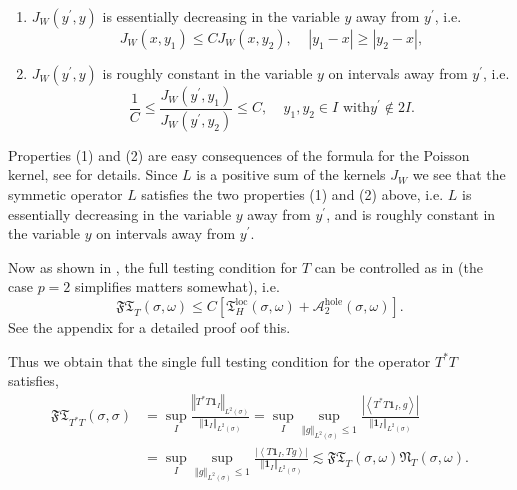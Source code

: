 \documentclass{amsart}%
\theoremstyle{plain}
\numberwithin{equation}{section}
\begin{document}
\begin{enumerate}
\item $J_{W}\left(  y^{\prime},y\right)  $ is essentially decreasing in the
variable $y$ away from $y^{\prime}$, i.e.%
\[
J_{W}\left(  x,y_{1}\right)  \leq CJ_{W}\left(  x,y_{2}\right)
,\ \ \ \ \ \left\vert y_{1}-x\right\vert \geq\left\vert y_{2}-x\right\vert ,
\]


\item $J_{W}\left(  y^{\prime},y\right)  $ is roughly constant in the variable
$y$ on intervals away from $y^{\prime}$, i.e.%
\[
\frac{1}{C}\leq\frac{J_{W}\left(  y^{\prime},y_{1}\right)  }{J_{W}\left(
y^{\prime},y_{2}\right)  }\leq C,\ \ \ \ \ y_{1},y_{2}\in I\text{ with
}y^{\prime}\notin2I.
\]

\end{enumerate}

Properties (1) and (2) are easy consequences of the formula for the Poisson
kernel, see \cite[(7.10) and (7.11)]{SaWi} for details. Since $L$ is a
positive sum of the kernels $J_{W}$ we see that the symmetic operator $L$
satisfies the two properties (1) and (2) above, i.e. $L$ is essentially
decreasing in the variable $y$ away from $y^{\prime}$, and is roughly constant
in the variable $y$ on intervals away from $y^{\prime}$.

Now as shown in \cite[Section 11, the appendix]{SaWi}, the full testing
condition for $T$ can be controlled as in \cite[Subsections 7.3 and 7.4]{SaWi}
(the case $p=2$ simplifies matters somewhat), i.e.%
\[
\mathfrak{FT}_{T}\left(  \sigma,\omega\right)  \leq C\left[  \mathfrak{T}%
_{H}^{\operatorname{loc}}\left(  \sigma,\omega\right)  +\mathcal{A}%
_{2}^{\operatorname*{hole}}\left(  \sigma,\omega\right)  \right]  .
\]
See the appendix for a detailed proof oof this.

Thus we obtain that the single full testing condition for the operator
$T^{\ast}T$ satisfies,%
\begin{align}
\mathfrak{FT}_{T^{\ast}T}\left(  \sigma,\sigma\right)    & =\sup_{I}%
\frac{\left\Vert T^{\ast}T\mathbf{1}_{I}\right\Vert _{L^{2}\left(
\sigma\right)  }}{\left\Vert \mathbf{1}_{I}\right\Vert _{L^{2}\left(
\sigma\right)  }}=\sup_{I}\sup_{\left\Vert g\right\Vert _{L^{2}\left(
\sigma\right)  }\leq1}\frac{\left\vert \left\langle T^{\ast}T\mathbf{1}%
_{I},g\right\rangle \right\vert }{\left\Vert \mathbf{1}_{I}\right\Vert
_{L^{2}\left(  \sigma\right)  }}\label{single full test}\\
& =\sup_{I}\sup_{\left\Vert g\right\Vert _{L^{2}\left(  \sigma\right)  }\leq
1}\frac{\left\vert \left\langle T\mathbf{1}_{I},Tg\right\rangle \right\vert
}{\left\Vert \mathbf{1}_{I}\right\Vert _{L^{2}\left(  \sigma\right)  }%
}\lesssim\mathfrak{FT}_{T}\left(  \sigma,\omega\right)  \mathfrak{N}%
_{T}\left(  \sigma,\omega\right)  .\nonumber
\end{align}
\end{document}
